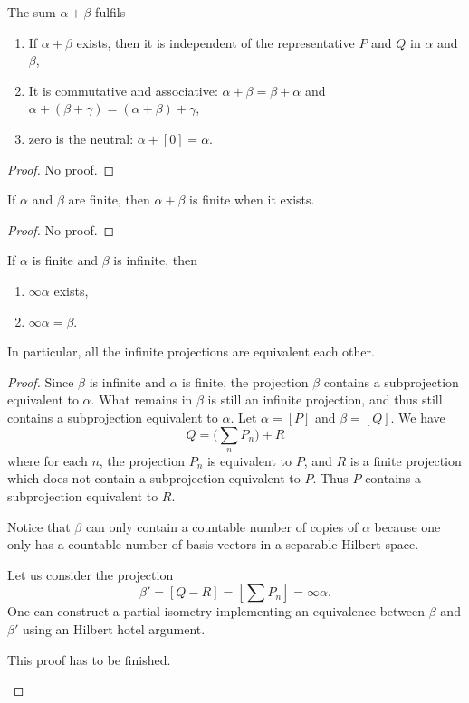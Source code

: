 \begin{proposition}
The sum $\alpha+\beta$ fulfils
\begin{enumerate}
\item If $\alpha+\beta$ exists, then it is independent of the representative $P$ and $Q$ in $\alpha$ and $\beta$,
\item It is commutative and associative: $\alpha+\beta=\beta+\alpha$ and $\alpha+(\beta+\gamma)=(\alpha+\beta)+\gamma$,
\item zero is the neutral: $\alpha+[0]=\alpha$.
\end{enumerate}
\end{proposition}

\begin{proof}
No proof.
\end{proof}

\begin{lemma}
If $\alpha$ and $\beta$ are finite, then $\alpha+\beta$ is finite when it exists.
\end{lemma}
\begin{proof}
No proof.
\end{proof}

\begin{lemma}
If $\alpha$ is finite and $\beta$ is infinite, then
\begin{enumerate}
\item $\infty\alpha$ exists,
\item $\infty\alpha=\beta$.
\end{enumerate}
In particular, all the infinite projections are equivalent each other.
\end{lemma}

\begin{proof}
Since $\beta$ is infinite and $\alpha$ is finite, the projection $\beta$ contains a subprojection equivalent to $\alpha$. What remains in $\beta$ is still an infinite projection, and thus still contains a subprojection equivalent to $\alpha$. Let $\alpha=[P]$ and $\beta=[Q]$. We have
\[ 
  Q=\big( \sum_nP_n \big)+R
\]
where for each $n$, the projection $P_n$ is equivalent to $P$, and $R$ is a finite projection which does not contain a subprojection equivalent to $P$. Thus $P$ contains a subprojection equivalent to $R$.

Notice that $\beta$ can only contain a countable number of copies of $\alpha$ because one only has a countable number of basis vectors in a separable Hilbert space.

Let us consider the projection
\begin{equation}
	\beta'=[Q-R]=[\sum P_n]=\infty\alpha.
\end{equation}
One can construct a partial isometry implementing an equivalence between $\beta$ and $\beta'$ using an Hilbert hotel argument.
\begin{probleme}
This proof has to be finished.
\end{probleme}
\end{proof}


